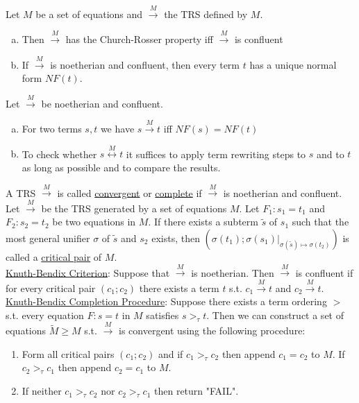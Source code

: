 \documentclass[a4paper]{article}
\newcommand{\ul}{\underline}
\begin{document}
Let $M$ be a set of equations and $\overset{M}{\rightarrow}$ the TRS defined by $M$.
\begin{enumerate}[(a)]
	\item Then $\overset{M}{\rightarrow}$ has the Church-Rosser property iff $\overset{M}{\rightarrow}$ is confluent
	\item If $\overset{M}{\rightarrow}$ is noetherian and confluent, then every term $t$ has a unique normal form $NF(t)$.
\end{enumerate}
Let $\overset{M}{\rightarrow}$ be noetherian and confluent.
\begin{enumerate}[(a)]
	\item For two terms $s,t$ we have $s\overset{M}{\rightarrow}t$ iff $NF(s)=NF(t)$
	\item To check whether $s\overset{M}{\leftrightarrow}t$ it suffices to apply term rewriting steps to $s$ and to $t$ as long as possible and to compare the results.
\end{enumerate}
A TRS $\overset{M}{\rightarrow}$ is called \ul{convergent} or \ul{complete} if $\overset{M}{\rightarrow}$ is noetherian and confluent.\\
Let $\overset{M}{\rightarrow}$ be the TRS generated by a set of equations $M$. Let $F_1:s_1=t_1$ and $F_2:s_2=t_2$ be two equations in $M$. If there exists a subterm $\tilde s$ of $s_1$ such that the most general unifier $\sigma$ of $\tilde s$ and $s_2$ exists, then $(\sigma(t_1);\sigma(s_1)\vert_{\sigma(\tilde s)\mapsto \sigma(t_2)})$ is called a \ul{critical pair} of $M$.\\
\ul{Knuth-Bendix Criterion}: Suppose that $\overset{M}{\rightarrow}$ is noetherian. Then $\overset{M}{\rightarrow}$ is confluent if for every critical pair $(c_1;c_2)$ there exists a term $t$ s.t. $c_1\overset{M}{\rightarrow}t$ and $c_2\overset{M}{\rightarrow}t$.\\
\ul{Knuth-Bendix Completion Procedure}: Suppose there exists a term ordering $>$ s.t. every equation $F:s=t$ in $M$ satisfies $s>_\tau t$. Then we can construct a set of equations $\tilde M\geq M$ s.t. $\overset{M}{\rightarrow}$ is convergent using the following procedure:
\begin{enumerate}[(1)]
	\item Form all critical pairs $(c_1;c_2)$ and if $c_1>_\tau c_2$ then append $c_1=c_2$ to $M$. If $c_2>_\tau c_1$ then append $c_2=c_1$ to $M$.
	\item If neither $c_1>_\tau c_2$ nor $c_2>_\tau c_1$ then return "FAIL".
\end{enumerate}
\end{document}
